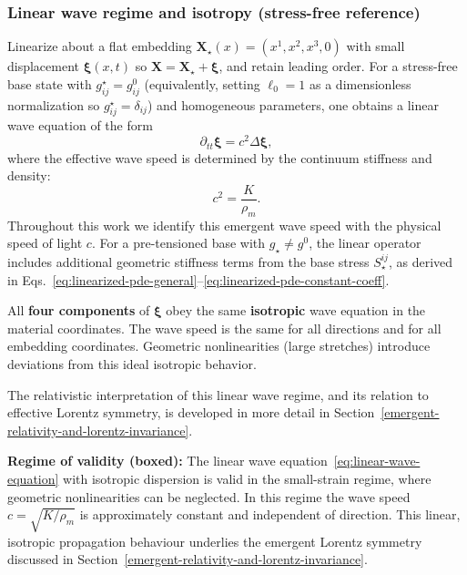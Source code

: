 \subsubsection{Linear wave regime and isotropy (stress-free reference)}\label{linear-wave-regime-and-isotropy}

Linearize about a flat embedding $\mathbf X_\star(x)=(x^1,x^2,x^3,0)$ with small displacement $\boldsymbol\xi(x,t)$ so $\mathbf X=\mathbf X_\star+\boldsymbol\xi$, and retain leading order. For a stress-free base state with $g^\star_{ij}=g^0_{ij}$ (equivalently, setting $\ell_0=1$ as a dimensionless normalization so $g^\star_{ij}=\delta_{ij}$) and homogeneous parameters, one obtains a linear wave equation of the form
\begin{equation}
\partial_{tt}\boldsymbol\xi = c^2\Delta\boldsymbol\xi,
\label{eq:linear-wave-equation}
\end{equation}
where the effective wave speed is determined by the continuum stiffness and density:
\begin{equation}
c^2 = \frac{K}{\rho_m}.
\end{equation}
Throughout this work we identify this emergent wave speed with the physical speed of light $c$.
For a pre-tensioned base with $g_\star\neq g^0$, the linear operator includes additional geometric stiffness terms from the base stress $S_\star^{ij}$, as derived in Eqs.~\eqref{eq:linearized-pde-general}--\eqref{eq:linearized-pde-constant-coeff}.

All \textbf{four components} of $\boldsymbol\xi$ obey the same \textbf{isotropic} wave equation in the material coordinates. The wave speed is the same for all directions and for all embedding coordinates. Geometric nonlinearities (large stretches) introduce deviations from this ideal isotropic behavior.

The relativistic interpretation of this linear wave regime, and its relation to
effective Lorentz symmetry, is developed in more detail in
Section~\ref{emergent-relativity-and-lorentz-invariance}.

\textbf{Regime of validity (boxed):}
The linear wave equation~\eqref{eq:linear-wave-equation} with isotropic
dispersion is valid in the small-strain regime, where geometric nonlinearities
can be neglected. In this regime the
wave speed $c=\sqrt{K/\rho_m}$ is approximately constant and independent of
direction. This linear, isotropic propagation behaviour underlies the emergent
Lorentz symmetry discussed in
Section~\ref{emergent-relativity-and-lorentz-invariance}.

